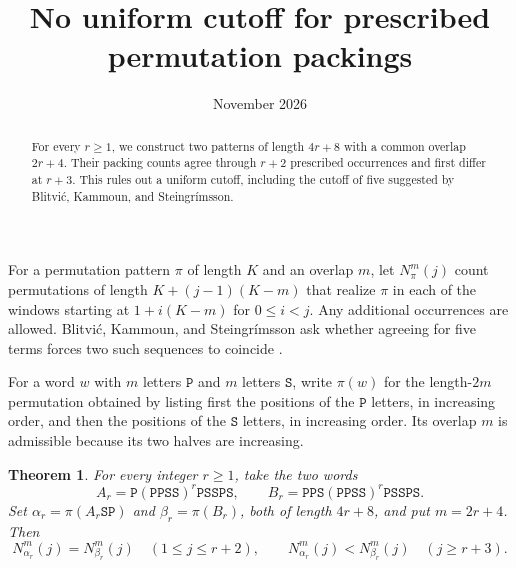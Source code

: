 \documentclass[11pt]{amsart}
\title{No uniform cutoff for prescribed permutation packings}
\date{November 2026}
\newtheorem{theorem}{Theorem}
\newcommand{\word}[1]{\mathtt{#1}}
\begin{document}
\begin{abstract}
For every $r\ge1$, we construct two patterns of length $4r+8$ with a common overlap $2r+4$. Their packing counts agree through $r+2$ prescribed occurrences and first differ at $r+3$. This rules out a uniform cutoff, including the cutoff of five suggested by Blitvi\'c, Kammoun, and Steingr\'imsson.
\end{abstract}
\maketitle

For a permutation pattern $\pi$ of length $K$ and an overlap $m$, let $N_{\pi}^{m}(j)$ count permutations of length $K+(j-1)(K-m)$ that realize $\pi$ in each of the windows starting at $1+i(K-m)$ for $0\le i<j$. Any additional occurrences are allowed. Blitvi\'c, Kammoun, and Steingr\'imsson ask whether agreeing for five terms forces two such sequences to coincide \cite[Section 7, Question 8]{BKS}.

For a word $w$ with $m$ letters $\word{P}$ and $m$ letters $\word{S}$, write $\pi(w)$ for the length-$2m$ permutation obtained by listing first the positions of the $\word{P}$ letters, in increasing order, and then the positions of the $\word{S}$ letters, in increasing order. Its overlap $m$ is admissible because its two halves are increasing.

\begin{theorem}\label{thm:main}
For every integer $r\ge1$, take the two words
\[
 A_r=\word{P}(\word{PPSS})^r\word{PSSPS},\qquad
 B_r=\word{PPS}(\word{PPSS})^r\word{PSSPS}.
\]
Set $\alpha_r=\pi(A_r\word{SP})$ and $\beta_r=\pi(B_r)$, both of length $4r+8$, and put $m=2r+4$. Then
\[
 N_{\alpha_r}^{m}(j)=N_{\beta_r}^{m}(j)\quad(1\le j\le r+2),
 \qquad N_{\alpha_r}^{m}(j)<N_{\beta_r}^{m}(j)\quad(j\ge r+3).
\]
\end{theorem}
\end{document}
